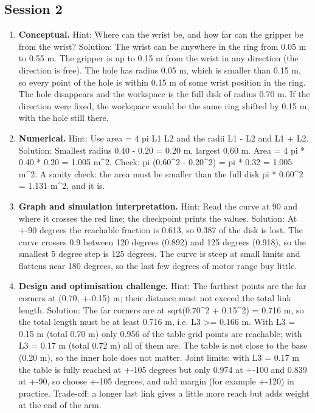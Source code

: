 \documentclass[11pt,a4paper]{article}
\begin{document}
\subsection*{Session 2}
\begin{enumerate}[nosep]
\item \textbf{Conceptual.} Hint: Where can the wrist be, and how far can the gripper be from the wrist? Solution: The wrist can be anywhere in the ring from 0.05 m to 0.55 m. The gripper is up to 0.15 m from the wrist in any direction (the direction is free). The hole has radius 0.05 m, which is smaller than 0.15 m, so every point of the hole is within 0.15 m of some wrist position in the ring. The hole disappears and the workspace is the full disk of radius 0.70 m. If the direction were fixed, the workspace would be the same ring shifted by 0.15 m, with the hole still there.
\item \textbf{Numerical.} Hint: Use area = 4 pi L1 L2 and the radii \textbar{}L1 - L2\textbar{} and L1 + L2. Solution: Smallest radius \textbar{}0.40 - 0.20\textbar{} = 0.20 m, largest 0.60 m. Area = 4 pi * 0.40 * 0.20 = 1.005 m\textasciicircum{}2. Check: pi (0.60\textasciicircum{}2 - 0.20\textasciicircum{}2) = pi * 0.32 = 1.005 m\textasciicircum{}2. A sanity check: the area must be smaller than the full disk pi * 0.60\textasciicircum{}2 = 1.131 m\textasciicircum{}2, and it is.
\item \textbf{Graph and simulation interpretation.} Hint: Read the curve at 90 and where it crosses the red line; the checkpoint prints the values. Solution: At +-90 degrees the reachable fraction is 0.613, so 0.387 of the disk is lost. The curve crosses 0.9 between 120 degrees (0.892) and 125 degrees (0.918), so the smallest 5 degree step is 125 degrees. The curve is steep at small limits and flattens near 180 degrees, so the last few degrees of motor range buy little.
\item \textbf{Design and optimisation challenge.} Hint: The farthest points are the far corners at (0.70, +-0.15) m; their distance must not exceed the total link length. Solution: The far corners are at sqrt(0.70\textasciicircum{}2 + 0.15\textasciicircum{}2) = 0.716 m, so the total length must be at least 0.716 m, i.e. L3 \textgreater{}= 0.166 m. With L3 = 0.15 m (total 0.70 m) only 0.956 of the table grid points are reachable; with L3 = 0.17 m (total 0.72 m) all of them are. The table is not close to the base (0.20 m), so the inner hole does not matter. Joint limits: with L3 = 0.17 m the table is fully reached at +-105 degrees but only 0.974 at +-100 and 0.839 at +-90, so choose +-105 degrees, and add margin (for example +-120) in practice. Trade-off: a longer last link gives a little more reach but adds weight at the end of the arm.
\end{enumerate}
\end{document}
